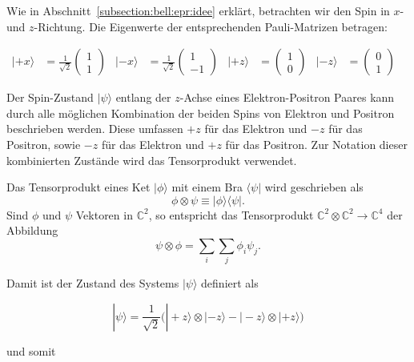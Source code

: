 \begin{refsection}
Wie in Abschnitt~\ref{subsection:bell:epr:idee} erkl\"art, betrachten wir
den Spin in $x$- und $z$-Richtung.
Die Eigenwerte der entsprechenden Pauli-Matrizen betragen:

\begin{align}
    |{+}x\rangle &= \frac{1}{\sqrt{2}}\begin{pmatrix} 1\\1 \end{pmatrix} &
    |{-}x\rangle &= \frac{1}{\sqrt{2}}\begin{pmatrix} 1\\-1 \end{pmatrix} &
    |{+}z\rangle &= \begin{pmatrix} 1\\0 \end{pmatrix} &
    |{-}z\rangle &= \begin{pmatrix} 0\\1 \end{pmatrix} &
\end{align}

Der Spin-Zustand $|\psi\rangle$ entlang der $z$-Achse eines 
Elektron-Positron Paares  kann durch alle m\"oglichen Kombination der beiden
Spins von Elektron und Positron beschrieben werden. 
Diese umfassen $+z$ f\"ur das Elektron und $-z$
f\"ur das Positron, sowie $-z$ f\"ur das Elektron und $+z$ f\"ur das Positron.
Zur Notation dieser kombinierten Zust\"ande wird das Tensorprodukt verwendet.

\begin{definition}\label{def:bell:tensorprodukt}
    Das Tensorprodukt eines Ket $|\phi\rangle$ mit einem Bra $\langle\psi|$
    wird geschrieben als
    \[
        \phi \otimes \psi \equiv |\phi\rangle\langle\psi|.
    \]
    Sind $\phi$ und $\psi$ Vektoren in $\mathbb{C}^2$, so entspricht das
    Tensorprodukt $\mathbb{C}^2 \otimes \mathbb{C}^2 \to \mathbb{C}^4$ 
    der Abbildung 
    \[
        \psi \otimes \phi = \sum_{i}\sum_{j} \phi_i \psi_j.
    \]
\end{definition}

Damit ist der Zustand des Systems $|\psi\rangle$ definiert als

\begin{equation}
    |\psi\rangle = \frac{1}{\sqrt{2}} \Big( 
        |{+}z\rangle \otimes |{-}z\rangle - |{-}z\rangle \otimes |{+}z\rangle
     \Big)
     \label{equ:bell:spinstate}
\end{equation}

und somit


\end{refsection}

